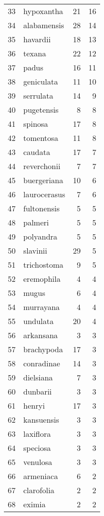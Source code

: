 \documentclass{article}\usepackage[]{graphicx}\usepackage[]{color}
\begin{document}
\begin{table}[ht]
\begin{tabular}{rlrr}
  33 & hypoxantha &  21 &  16 \\ 
  34 & alabamensis &  28 &  14 \\ 
  35 & havardii &  18 &  13 \\ 
  36 & texana &  22 &  12 \\ 
  37 & padus &  16 &  11 \\ 
  38 & geniculata &  11 &  10 \\ 
  39 & serrulata &  14 &   9 \\ 
  40 & pugetensis &   8 &   8 \\ 
  41 & spinosa &  17 &   8 \\ 
  42 & tomentosa &  11 &   8 \\ 
  43 & caudata &  17 &   7 \\ 
  44 & reverchonii &   7 &   7 \\ 
  45 & buergeriana &  10 &   6 \\ 
  46 & laurocerasus &   7 &   6 \\ 
  47 & fultonensis &   5 &   5 \\ 
  48 & palmeri &   5 &   5 \\ 
  49 & polyandra &   5 &   5 \\ 
  50 & slavinii &  29 &   5 \\ 
  51 & trichostoma &   9 &   5 \\ 
  52 & eremophila &   4 &   4 \\ 
  53 & mugus &   6 &   4 \\ 
  54 & murrayana &   4 &   4 \\ 
  55 & undulata &  20 &   4 \\ 
  56 & arkansana &   3 &   3 \\ 
  57 & brachypoda &  17 &   3 \\ 
  58 & conradinae &  14 &   3 \\ 
  59 & dielsiana &   7 &   3 \\ 
  60 & dunbarii &   3 &   3 \\ 
  61 & henryi &  17 &   3 \\ 
  62 & kansuensis &   3 &   3 \\ 
  63 & laxiflora &   3 &   3 \\ 
  64 & speciosa &   3 &   3 \\ 
  65 & venulosa &   3 &   3 \\ 
  66 & armeniaca &   6 &   2 \\ 
  67 & clarofolia &   2 &   2 \\ 
  68 & eximia &   2 &   2 \\ 

\end{tabular}
\end{table}
\end{document}

